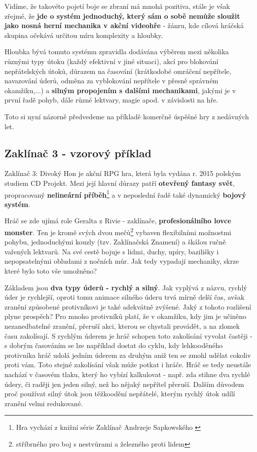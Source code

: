 Vidíme, že takovéto pojetí boje se zbraní má mnohá pozitiva, stále je však zřejmé, že \textbf{jde o systém jednoduchý, který sám o sobě nemůže sloužit jako nosná herní mechanika v akční videohře} - žánru, kde cílová hráčská skupina očekává určitou míru komplexity a hloubky.

Hloubka bývá tomuto systému zpravidla dodávána výběrem mezi několika různými typy útoku (každý efektivní v jiné situaci), akcí pro blokování nepřátelských útoků, důrazem na časování (krátkodobé omráčení nepřítele, navazování úderů, odměna za vyblokování nepřítele v přesně správném okamžiku,...) a \textbf{silným propojením s dalšími mechanikami}, jakými je v první řadě pohyb, dále různé lektvary, magie apod. v závislosti na hře.

Toto si nyní názorně předvedeme na příkladě komerčně úspěšné hry z nedávných let.

\subsection{Zaklínač 3 - vzorový příklad}
Zaklínač 3: Divoký Hon \cite{Wiedzmin3} je akční \acs{RPG} hra, která byla vydána r. 2015 polským studiem CD Projekt. Mezi její hlavní důrazy patří \textbf{otevřený fantasy svět}, propracovaný \textbf{nelineární příběh}\footnote{Hra vychází z knižní série Zaklínač Andrzeje Sapkowského \cite{SapkowskiZaklinac}} a v neposlední řadě také dynamický \textbf{bojový systém}.

Hráč se zde ujímá role Geralta z Rivie - zaklínače, \textbf{profesionálního lovce monster}. Ten je kromě svých dvou mečů\footnote{stříbrného pro boj s nestvůrami a železného proti lidem} vybaven flexibilními možnostmi pohybu, jednoduchými kouzly (tzv. Zaklínačská Znamení) a škálou ručně vařených lektvarů. Na své cestě bojuje s lidmi, duchy, upíry, bazilišky i nepopsatelnými obludami z nočních můr.
Jak tedy vypadají mechaniky, skrze které bylo toto vše umožněno?


Základem jsou \textbf{dva typy úderů - rychlý a silný}. Jak vyplývá z názvu, rychlý úder je rychlejší, oproti tomu animace silného úderu trvá mírně delší čas, avšak zranění způsobené protivníkovi je také adekvátně zvýšené. Jaký z tohoto rozlišení plyne prospěch? Pro mnoho protivníků platí, že v okamžiku, kdy jim je učiněno nezanedbatelné zranění, přeruší akci, kterou se chystali provádět, a na zlomek času zakolísají. S rychlým úderem je hráč schopen toto zakolísání vyvolat častěji - s dobrým časováním se lze například dostat do cyklu, kdy lehkooděného protivníka hráč udolá jedním úderem za druhým aniž ten se zmohl udělat cokoliv proti vám. Toto stejné zakolísání však může potkat i hráče. Hráč se tedy neustále nachází v časovém tlaku, který ho vybízí kalkulovat - např. zda stihne dva rychlé údery, či raději jen jeden silný, než ho nějaký nepřítel přeruší. Dalším důvodem proč používat silný útok jsou těžkoodění nepřátelé, kterým rychlý útok udílí zranění velmi redukované. 


